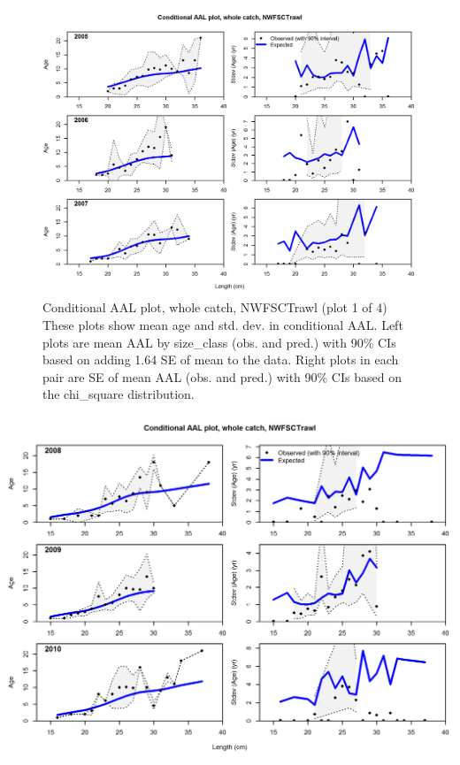 \documentclass[12pt,]{article}
\begin{document}
\FloatBarrier

\begin{figure}[htbp]
\centering
\includegraphics{./r4ss/plots_mod1/comp_condAALfit_Andre_plotsflt8mkt0_page1.png}
\caption{Conditional AAL plot, whole catch, NWFSCTrawl (plot 1 of 4)
These plots show mean age and std. dev. in conditional AAL. Left plots
are mean AAL by size\_class (obs. and pred.) with 90\% CIs based on
adding 1.64 SE of mean to the data. Right plots in each pair are SE of
mean AAL (obs. and pred.) with 90\% CIs based on the chi\_square
distribution.
\label{fig:mod1_4_comp_condAALfit_Andre_plotsflt8mkt0_page1}}
\end{figure}

\includegraphics{./r4ss/plots_mod1/comp_condAALfit_Andre_plotsflt8mkt0_page2.png}
\end{document}
